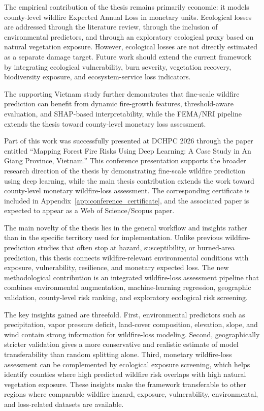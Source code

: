 The empirical contribution of the thesis remains primarily economic: it models county-level wildfire Expected Annual Loss in monetary units. Ecological losses are addressed through the literature review, through the inclusion of environmental predictors, and through an exploratory ecological proxy based on natural vegetation exposure. However, ecological losses are not directly estimated as a separate damage target. Future work should extend the current framework by integrating ecological vulnerability, burn severity, vegetation recovery, biodiversity exposure, and ecosystem-service loss indicators.

The supporting Vietnam study further demonstrates that fine-scale wildfire prediction can benefit from dynamic fire-growth features, threshold-aware evaluation, and SHAP-based interpretability, while the FEMA/NRI pipeline extends the thesis toward county-level monetary loss assessment.

Part of this work was successfully presented at DCHPC 2026 through the paper entitled ``Mapping Forest Fire Risks Using Deep Learning: A Case Study in An Giang Province, Vietnam.'' This conference presentation supports the broader research direction of the thesis by demonstrating fine-scale wildfire prediction using deep learning, while the main thesis contribution extends the work toward county-level monetary wildfire-loss assessment. The corresponding certificate is included in Appendix~\ref{app:conference_certificate}, and the associated paper is expected to appear as a Web of Science/Scopus paper.

The main novelty of the thesis lies in the general workflow and insights rather than in the specific territory used for implementation. Unlike previous wildfire-prediction studies that often stop at hazard, susceptibility, or burned-area prediction, this thesis connects wildfire-relevant environmental conditions with exposure, vulnerability, resilience, and monetary expected loss. The new methodological contribution is an integrated wildfire-loss assessment pipeline that combines environmental augmentation, machine-learning regression, geographic validation, county-level risk ranking, and exploratory ecological risk screening.

The key insights gained are threefold. First, environmental predictors such as precipitation, vapor pressure deficit, land-cover composition, elevation, slope, and wind contain strong information for wildfire-loss modeling. Second, geographically stricter validation gives a more conservative and realistic estimate of model transferability than random splitting alone. Third, monetary wildfire-loss assessment can be complemented by ecological exposure screening, which helps identify counties where high predicted wildfire risk overlaps with high natural vegetation exposure. These insights make the framework transferable to other regions where comparable wildfire hazard, exposure, vulnerability, environmental, and loss-related datasets are available.


